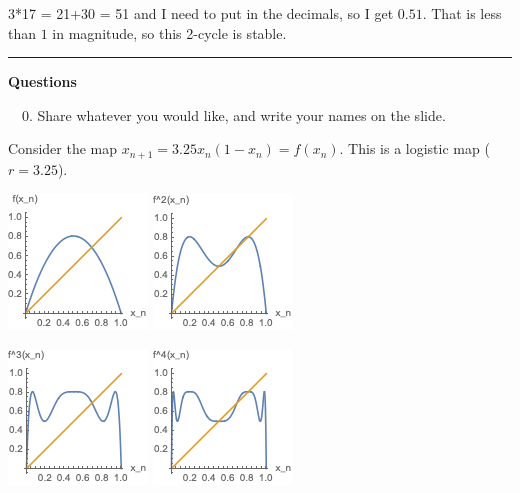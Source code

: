 \documentclass[12pt,letterpaper,noanswers]{exam}
\begin{document}
3*17 = 21+30 = 51 and I need to put in the decimals, so I get $0.51$.  That is less than $1$ in magnitude, so this 2-cycle is stable.


\vspace{0.2cm}

\hrule
\vspace{0.2cm}
\noindent\textbf{Questions}

\noindent \ \ 0.  Share whatever you would like, and write your names on the slide.

\begin{questions}

\question
Consider the map $x_{n+1} = 3.25 x_n(1-x_n) = f(x_n)$.  This is a logistic map ($r = 3.25$).

\includegraphics{img/191104-C25p4.png}
\includegraphics{img/191104-C25p4b.png}

\includegraphics{img/191104-C25p4c.png}
\includegraphics{img/191104-C25p4d.png}



\end{questions}
\end{document}
